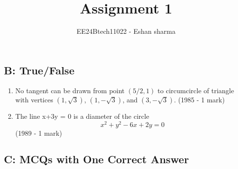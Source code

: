 \documentclass[journal,12pt,twocolumn]{IEEEtran}
\theoremstyle{remark}
\begin{document}

\vspace{3cm}

\title{Assignment 1}
\author{EE24Btech11022 - Eshan sharma}
\maketitle
\newpage
\bigskip

\renewcommand{\thefigure}{\theenumi}
\renewcommand{\thetable}{\theenumi}


\subsection*{B: True/False}


\begin{enumerate}[label=\arabic*.]
    \item No tangent can be drawn from point $(5/2, 1)$ to circumcircle of triangle with vertices $(1, \sqrt{3})$, $(1, -\sqrt{3})$, and $(3, -\sqrt{3})$.
    \hfill{(1985 - 1 mark)}
    \item The line x+3y = 0 is a diameter of the circle \[\ x^{2} + y^{2} - 6x +2y = 0\]
    \hfill{(1989 - 1 mark)}
\end{enumerate}

\subsection*{C: MCQs with One Correct Answer}
\end{document}
